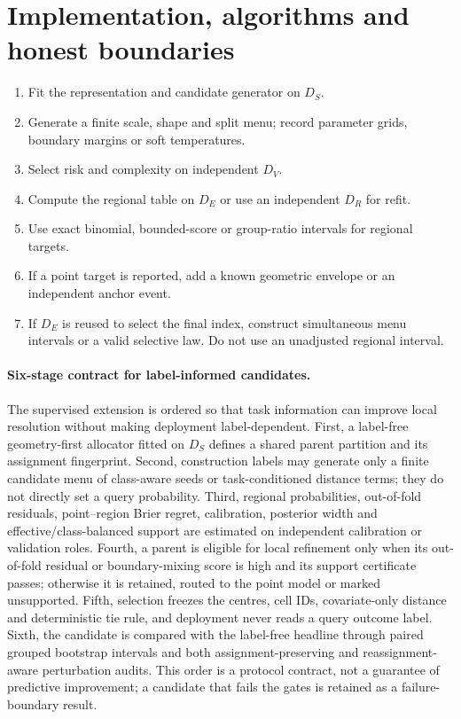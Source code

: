 \documentclass[11pt,a4paper]{article}
\numberwithin{equation}{section}
\theoremstyle{definition}\newtheorem{definition}[theorem]{Definition}
\theoremstyle{remark}\newtheorem{remark}[theorem]{Remark}
\begin{document}
\section{Implementation, algorithms and honest boundaries}\label{sec:implementation}
\begin{enumerate}
\item Fit the representation and candidate generator on $D_S$.
\item Generate a finite scale, shape and split menu; record parameter grids, boundary margins or soft temperatures.
\item Select risk and complexity on independent $D_V$.
\item Compute the regional table on $D_E$ or use an independent $D_R$ for refit.
\item Use exact binomial, bounded-score or group-ratio intervals for regional targets.
\item If a point target is reported, add a known geometric envelope or an independent anchor event.
\item If $D_E$ is reused to select the final index, construct simultaneous menu intervals or a valid selective law. Do not use an unadjusted regional interval.
\end{enumerate}

\paragraph{Six-stage contract for label-informed candidates.}
The supervised extension is ordered so that task information can improve local resolution without making deployment label-dependent. First, a label-free geometry-first allocator fitted on $D_S$ defines a shared parent partition and its assignment fingerprint. Second, construction labels may generate only a finite candidate menu of class-aware seeds or task-conditioned distance terms; they do not directly set a query probability. Third, regional probabilities, out-of-fold residuals, point--region Brier regret, calibration, posterior width and effective/class-balanced support are estimated on independent calibration or validation roles. Fourth, a parent is eligible for local refinement only when its out-of-fold residual or boundary-mixing score is high and its support certificate passes; otherwise it is retained, routed to the point model or marked unsupported. Fifth, selection freezes the centres, cell IDs, covariate-only distance and deterministic tie rule, and deployment never reads a query outcome label. Sixth, the candidate is compared with the label-free headline through paired grouped bootstrap intervals and both assignment-preserving and reassignment-aware perturbation audits. This order is a protocol contract, not a guarantee of predictive improvement; a candidate that fails the gates is retained as a failure-boundary result.
\end{document}
